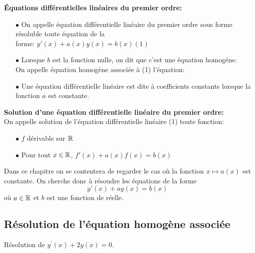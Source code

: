 \documentclass[a4paper, 11pt]{article}
\begin{document}
  {\noindent

    \begin{defi}  \textbf{\'Equations diff\'erentielles lin\'eaires du premier ordre:}
      \begin{itemize}
        \item[$\bullet$] On appelle \'equation diff\'erentielle lin\'eaire du premier ordre sous forme r\'esoluble toute \'equation de la\vsec\\
              forme: $y'(x)+a(x)y(x)=b(x) (1) $
        \item[$\bullet$] Lorsque $b$ est la fonction nulle, on dit que c'est une équation homogéne. \vsec\\
              \noindent On appelle \'equation homog\`ene associ\'ee \`a (1) l'\'equation: \\
              \vsec
        \item[$\bullet$] Une \'equation diff\'erentielle lin\'eaire est dite \`a coefficients constants lorsque la fonction $a$ est constante.
      \end{itemize}
    \end{defi}

  }
\vsec\vsec

{\noindent

  \begin{defi}  \textbf{Solution d'une \'equation diff\'erentielle lin\'eaire du premier ordre:}\\
    \noindent On appelle solution de l'\'equation diff\'erentielle lin\'eaire (1) toute fonction: \vsec
    \begin{itemize}
      \item[$\bullet$] $f$ dérivable sur $\mathbb{R}$ \vsec
      \item[$\bullet$] Pour tout $x\in\mathbb{R}$,  $f'(x) +a(x)f(x)=b(x)$\vsec
    \end{itemize}
  \end{defi}

}

Dans ce chapitre on se contentera de regarder le cas où la fonction $x\mapsto a(x)$ est constante. On cherche donc à résoudre les équations de la forme
$$y'(x)+ay(x)=b(x)  $$
où $a\in\mathbb{R}$ et $b$ est une fonction de réelle.
\subsection{Résolution de l'équation homogène associée}
\begin{exercice}
  R\'esolution de $y^{\prime}(x)+2y(x)=0$.
\end{exercice}
\end{document}
